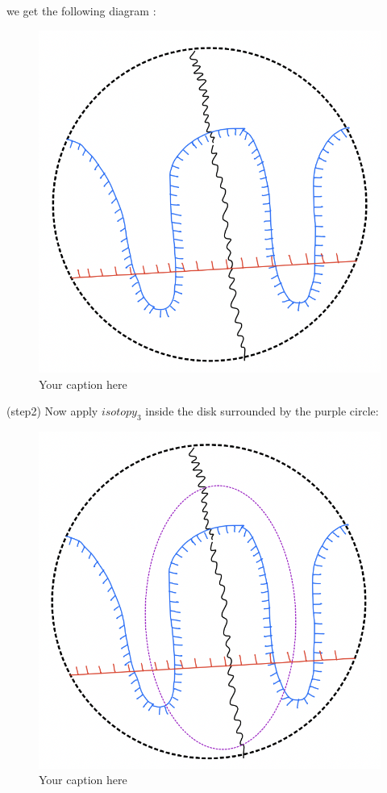 we get the following diagram :
\begin{figure}[H] %
    \centering
    \includegraphics[width=\linewidth]{diagrams/lemma5/3.png} %
    \caption{Your caption here}
    \label{fig:your-label}
\end{figure}
(step2) Now apply $isotopy_3$ inside the disk surrounded by the purple circle:
\begin{figure}[H] %
    \centering
    \includegraphics[width=\linewidth]{diagrams/lemma5/4.png} %
    \caption{Your caption here}
    \label{fig:your-label}
\end{figure}

